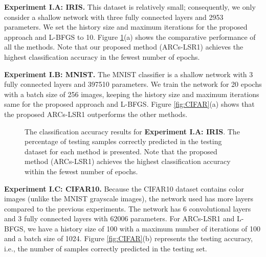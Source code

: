 \noindent 

\textbf{Experiment I.A: IRIS.}  %
This dataset is relatively small; consequently, we only consider a shallow network with three fully connected layers and 2953 parameters. We set the history size and maximum iterations for the proposed approach and L-BFGS to 10. Figure \ref{fig:IRIS}(a) shows the comparative performance of all the methods. Note that our proposed method (ARCs-LSR1) achieves the highest classification accuracy in the fewest number of epochs. 

\noindent 
\textbf{Experiment I.B: MNIST.} The MNIST classifier is a shallow network with 3 fully connected layers and 397510 parameters. We train the network for 20 epochs with a batch size of 256 images, keeping the history size and maximum iterations same for the proposed approach and L-BFGS. Figure \ref{fig:CIFAR}(a) shows that the proposed ARCs-LSR1 outperforms the other methods.

\begin{figure}[!htbp]
    \centering
{}
    \caption{The classification accuracy results for \textbf{Experiment I.A: IRIS}. 
	The percentage of testing samples correctly predicted in the testing dataset for each method is presented. Note that the proposed method (ARCs-LSR1) achieves the highest classification accuracy within the fewest number of epochs.}
    \label{fig:IRIS}
\end{figure}
\noindent 
\textbf{Experiment I.C: CIFAR10.} Because the CIFAR10 dataset contains color images (unlike the MNIST grayscale images), the network used  has more layers compared to the previous  experiments.  The network has 6 convolutional layers and 3 fully connected layers with 62006 parameters. For ARCs-LSR1 and L-BFGS, we have a history size of 100 with a maximum number of iterations of 100 and a batch size of 1024. Figure \ref{fig:CIFAR}(b) represents the testing accuracy, i.e., the number of samples correctly predicted in the testing set.




